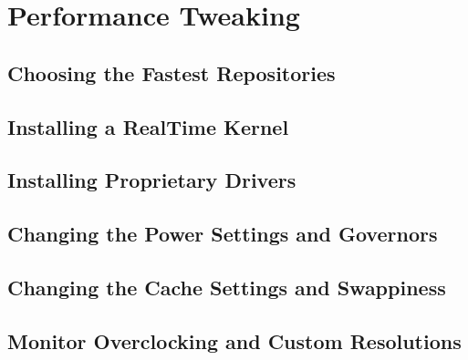\chapter{Performance Tweaking}
\localtableofcontents
\clearpage

\section{Choosing the Fastest Repositories}

\linebreak

\section{Installing a Real\-Time Kernel}

\linebreak

\section{Installing Proprietary Drivers}

\linebreak

\section{Changing the Power Settings and Governors}

\linebreak

\section{Changing the Cache Settings and Swappiness}

\linebreak

\section{Monitor Overclocking and Custom Resolutions}

\linebreak